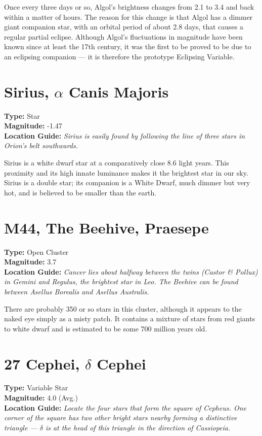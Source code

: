 Once every three days or so, Algol's brightness changes from 2.1 to 3.4
and back within a matter of hours. The reason for this change is that
Algol has a dimmer giant companion star, with an orbital period of
about 2.8 days, that causes a regular partial eclipse. Although
Algol's fluctuations in magnitude have been known since at least the
17th century, it was the first to be proved to be due to an eclipsing
companion --- it is therefore the prototype Eclipsing Variable.

\section{Sirius, \texorpdfstring{$\alpha$}{alpha} Canis Majoris}
\textbf{Type:} Star \\
\textbf{Magnitude:} -1.47 \\
\textbf{Location Guide:} \textit{Sirius is easily found by following the line of three stars in Orion's belt southwards.} 

Sirius is a white dwarf star at a comparatively close 8.6 light
years. This proximity and its high innate luminance makes it the
brightest star in our sky. Sirius is a double star; its companion is a White Dwarf, much dimmer but very hot, and is believed to be smaller than the earth.

\section{M44, The Beehive, Praesepe}
\textbf{Type:} Open Cluster \\
\textbf{Magnitude:} 3.7 \\
\textbf{Location Guide:} \textit{Cancer lies about halfway between the
  twins (Castor \& Pollux) in Gemini and Regulus, the brightest star
  in Leo. The Beehive can be found between Asellus Borealis and
  Asellus Australis.}

There are probably 350 or so stars in this cluster, although it appears
to the naked eye simply as a misty patch. It contains a mixture of
stars from red giants to white dwarf and is estimated to be some 700
million years old.

\section{27 Cephei, \texorpdfstring{$\delta$}{delta} Cephei} 
\textbf{Type:} Variable Star \\
\textbf{Magnitude:} 4.0 (Avg.) \\
\textbf{Location Guide:} \textit{Locate the four stars that form the
  square of Cepheus. One corner of the square has two other bright
  stars nearby forming a distinctive triangle --- $\delta$ is at the
  head of this triangle in the direction of Cassiopeia.}

